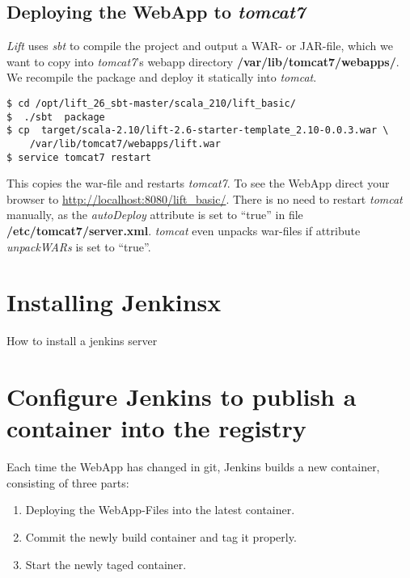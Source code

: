 \documentclass[11pt]{article}
\begin{document}
\subsection{Deploying the WebApp to \emph{tomcat7}}
\label{sec-3-3}

\emph{Lift} uses \emph{sbt} to compile the project and output a WAR- or JAR-file, which we want to copy into \emph{tomcat7}'s webapp directory \textbf{/var/lib/tomcat7/webapps/}. We recompile the package and deploy it statically into \emph{tomcat}.

\begin{verbatim}
$ cd /opt/lift_26_sbt-master/scala_210/lift_basic/
$  ./sbt  package
$ cp  target/scala-2.10/lift-2.6-starter-template_2.10-0.0.3.war \
    /var/lib/tomcat7/webapps/lift.war
$ service tomcat7 restart
\end{verbatim}
This copies the war-file and restarts \emph{tomcat7}. To see the WebApp direct your browser to \href{http://localhost:8080/lift_basic/}{http://localhost:8080/lift\_basic/}. There is no need to restart \emph{tomcat} manually, as the \emph{autoDeploy} attribute is set to ``true'' in file \textbf{/etc/tomcat7/server.xml}. \emph{tomcat} even unpacks war-files if attribute \emph{unpackWARs} is set to ``true''.
\section{Installing Jenkinsx}
\label{sec-4}

How to install a jenkins server
\section{Configure Jenkins to publish a container into the registry}
\label{sec-5}


Each time the WebApp has changed in git, Jenkins builds a new container,  consisting of three parts:
\begin{enumerate}
\item Deploying the WebApp-Files into the latest container.
\item Commit the newly build container and tag it properly.
\item Start the newly taged container.
\end{enumerate}
\end{document}

